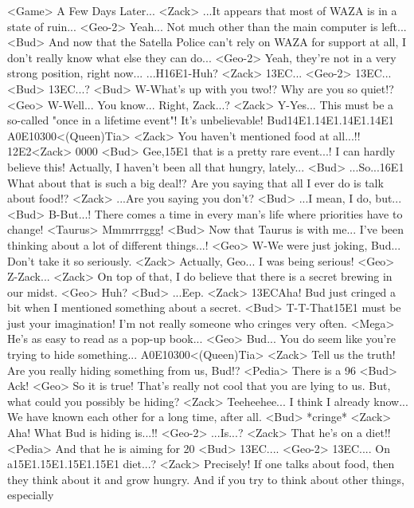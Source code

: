 <Game> A Few Days Later... 
<Zack> ...It appears that most of WAZA is in a state of ruin... 
<Geo-2> Yeah... 
Not much other than the main computer is left... 
<Bud> And now that the Satella Police can't rely on WAZA for support at all, I don't 
really know what else they can do... 
<Geo-2> Yeah, they're not in a very strong position, right now... 
...H{16}{E1}-Huh? 
<Zack> {13}{EC}... 
<Geo-2> {13}{EC}... 
<Bud> {13}{EC}...? 
<Bud> W-What's up with you two!? 
Why are you so quiet!? 
<Geo> W-Well... You know... 
Right, Zack...? 
<Zack> Y-Yes... 
This must be a so-called "once in a lifetime event"! 
It's unbelievable! 
Bud{14}{E1}.{14}{E1}.{14}{E1}.{14}{E1} 
{A0}{E1}{03}{00}<(Queen)Tia> 
<Zack> You haven't mentioned food at all...!! 
{12}{E2}<Zack> {00}{00} 
<Bud> Gee,{15}{E1} that is a pretty rare event...! 
I can hardly believe this! 
Actually, I haven't been all that hungry, lately... 
<Bud> ...So...{16}{E1} What about that is such a big deal!? 
Are you saying that all I ever do is talk about food!? 
<Zack> ...Are you saying you don't? 
<Bud> ...I mean, I do, but... 
<Bud> B-But...! 
There comes a time in every man's life where priorities have to change! 
<Taurus> Mmmrrrggg! 
<Bud> Now that Taurus is with me... 
I've been thinking about a lot of different things...! 
<Geo> W-We were just joking, Bud... Don't take it so seriously. 
<Zack> Actually, Geo... I was being serious! 
<Geo> Z-Zack... 
<Zack> On top of that, I do believe that there is a secret brewing in our midst. 
<Geo> Huh? 
<Bud> ...Eep. 
<Zack> {13}{EC}Aha! 
Bud just cringed a bit when I mentioned something about a secret. 
<Bud> T-T-That{15}{E1} must be just your imagination! 
I'm not really someone who cringes very often. 
<Mega> He's as easy to read as a pop-up book... 
<Geo> Bud... You do seem like you're trying to hide something... 
{A0}{E1}{03}{00}<(Queen)Tia> 
<Zack> Tell us the truth! 
Are you really hiding something from us, Bud!? 
<Pedia> There is a 96%
<Bud> Ack! 
<Geo> So it is true! 
That's really not cool that you are lying to us. 
But, what could you possibly be hiding? 
<Zack> Teeheehee... 
I think I already know... 
We have known each other for a long time, after all. 
<Bud> *cringe* 
<Zack> Aha! 
What Bud is hiding is...!! 
<Geo-2> ...Is...? 
<Zack> That he's on a diet!! 
<Pedia> And that he is aiming for 20%
<Bud> {13}{EC}.... 
<Geo-2> {13}{EC}.... 
On a{15}{E1}.{15}{E1}.{15}{E1}.{15}{E1} diet...? 
<Zack> Precisely! 
If one talks about food, then they think about it and grow hungry. 
And if you try to think about other things, especially 
